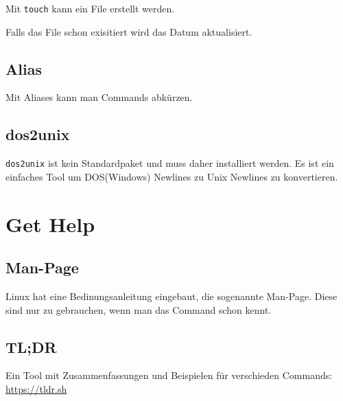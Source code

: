 \documentclass{article}
\begin{document}
Mit \texttt{touch} kann ein File erstellt werden.

Falls das File schon exisitiert wird das Datum aktualisiert.


\subsection{Alias}
Mit Aliases kann man Commands abkürzen.


\subsection{dos2unix}
\texttt{dos2unix} ist kein Standardpaket und muss daher installiert werden.
Es ist ein einfaches Tool um DOS(Windows) Newlines zu Unix Newlines zu konvertieren. 

\section{Get Help}
\subsection{Man-Page}
Linux hat eine Bedinungsanleitung eingebaut, die sogenannte Man-Page.
Diese sind nur zu gebrauchen, wenn man das Command schon kennt.

\subsection{TL;DR}
Ein Tool mit Zusammenfassungen und Beispielen für verschieden Commands: \href{https://tldr.sh/}{https://tldr.sh}
\end{document}
